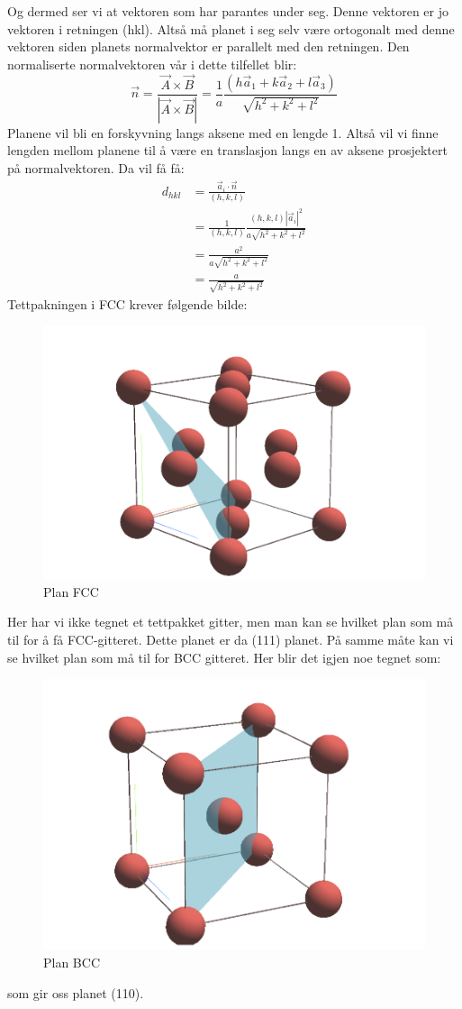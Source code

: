 \documentclass{article}
\begin{document}
Og dermed ser vi at vektoren som har parantes under seg. Denne vektoren er jo vektoren i retningen (hkl). Altså må planet i seg selv være ortogonalt med denne vektoren siden planets normalvektor er parallelt med den retningen.
Den normaliserte normalvektoren vår i dette tilfellet blir:
\begin{equation}
    \vec{n}= \frac{ \vec{A} \times \vec{B}}{| \vec{A} \times \vec{B}|} = \frac{1}{a} \frac{( h \vec{a}_1+k \vec{a}_2+l \vec{a}_3)}{\sqrt{h^2 + k^2 + l^2}}
\end{equation}
Planene vil bli en forskyvning langs aksene med en lengde 1. Altså vil vi finne lengden mellom planene til å være en translasjon langs en av aksene prosjektert på  normalvektoren. Da vil få få:
\begin{align}
    d_{hkl} &= \frac{\vec{a}_i \cdot \vec{n}}{(h, k, l)} \\
    &= \frac{1}{(h, k, l)} \frac{(h, k, l) |\vec{a}_i|^2}{a \sqrt{h^2 + k^2 + l^2}} \\
    &= \frac{a^2}{a\sqrt{h^2 + k^2 + l^2}} \\
    &= \frac{a}{\sqrt{h^2 + k^2 + l^2}}
\end{align}
Tettpakningen i FCC krever følgende bilde:
\begin{figure}[H]
    \centering
    \includegraphics[width=0.5\linewidth]{bilder_lf/tettpakning_fcc.png}
    \caption{Plan FCC}
    \label{fig:tettpakning_fcc}
\end{figure}
Her har vi ikke tegnet et tettpakket gitter, men man kan se hvilket plan som må til for å få FCC-gitteret. Dette planet er da (111) planet.
På samme måte kan vi se hvilket plan som må til for BCC gitteret. Her blir det igjen noe tegnet som:
\begin{figure}[H]
    \centering
    \includegraphics[width=0.5\linewidth]{bilder_lf/tettpakket_bcc.png}
    \caption{Plan BCC}
    \label{tettpakket_bcc}
\end{figure}
som gir oss planet (110).
\end{document}
